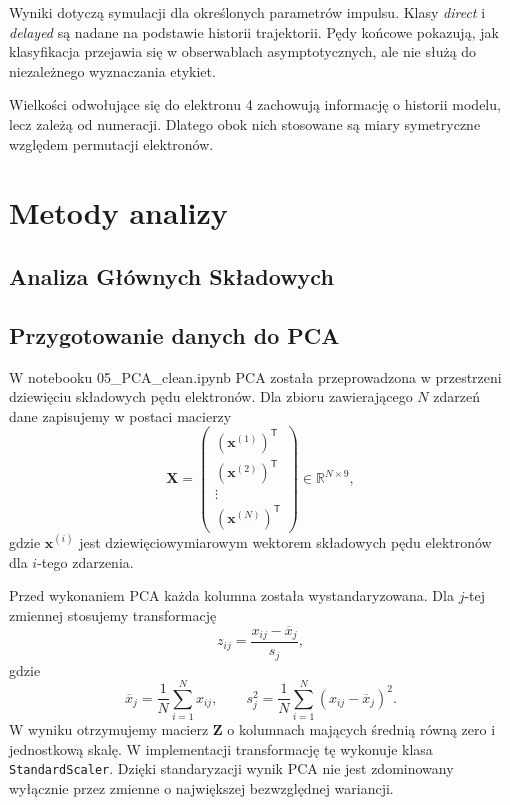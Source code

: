 \documentclass[12pt,letterpaper,oneside]{report}
\numberwithin{equation}{chapter}
\numberwithin{figure}{chapter}
\numberwithin{table}{chapter}
\newcommand{\direct}{\textit{direct}}
\newcommand{\delayed}{\textit{delayed}}
\begin{document}
Wyniki dotyczą symulacji dla określonych parametrów impulsu. Klasy \direct{} i \delayed{} są nadane na podstawie historii trajektorii. Pędy końcowe pokazują, jak klasyfikacja przejawia się w obserwablach asymptotycznych, ale nie służą do niezależnego wyznaczania etykiet.

Wielkości odwołujące się do elektronu 4 zachowują informację o historii modelu, lecz zależą od numeracji. Dlatego obok nich stosowane są miary symetryczne względem permutacji elektronów.


\chapter{Metody analizy}
\section{Analiza Głównych Składowych}

\section{Przygotowanie danych do PCA}

W notebooku 05\_PCA\_clean.ipynb PCA została przeprowadzona w przestrzeni
dziewięciu składowych pędu elektronów. Dla zbioru zawierającego $N$
zdarzeń dane zapisujemy w postaci macierzy
\begin{equation}
\mathbf X=
\begin{pmatrix}
(\mathbf x^{(1)})^{\mathsf T}\\
(\mathbf x^{(2)})^{\mathsf T}\\
\vdots\\
(\mathbf x^{(N)})^{\mathsf T}
\end{pmatrix}
\in \mathbb{R}^{N\times 9},
\label{eq:pca-data-matrix}
\end{equation}
gdzie $\mathbf x^{(i)}$ jest dziewięciowymiarowym wektorem składowych
pędu elektronów dla $i$-tego zdarzenia.

Przed wykonaniem PCA każda kolumna została wystandaryzowana. Dla
$j$-tej zmiennej stosujemy transformację
\begin{equation}
z_{ij}=\frac{x_{ij}-\overline{x}_j}{s_j},
\label{eq:pca-standardization}
\end{equation}
gdzie
\begin{equation}
\overline{x}_j=\frac{1}{N}\sum_{i=1}^{N}x_{ij},
\qquad
s_j^2=\frac{1}{N}\sum_{i=1}^{N}
\left(x_{ij}-\overline{x}_j\right)^2.
\label{eq:pca-mean-std}
\end{equation}
W wyniku otrzymujemy macierz $\mathbf Z$ o kolumnach mających średnią
równą zero i jednostkową skalę. W implementacji transformację tę
wykonuje klasa \texttt{StandardScaler}. Dzięki standaryzacji wynik PCA
nie jest zdominowany wyłącznie przez zmienne o największej bezwzględnej
wariancji.
\end{document}

